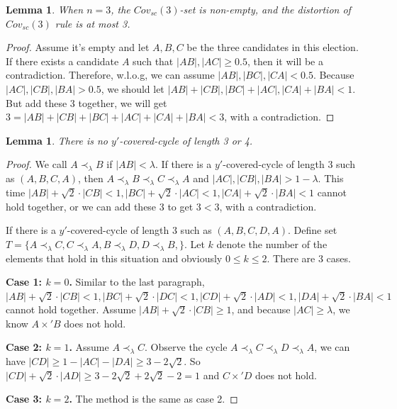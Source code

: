 \documentclass[11pt]{article}
\newtheorem{lemma}[theorem]{Lemma}
\theoremstyle{remark}
\begin{document}
\begin{lemma}
When $n=3$, the $Cov_{sc}(3)$-set is non-empty, and the distortion of $Cov_{sc}(3)$ rule is at most 3.
\end{lemma}

\begin{proof}
Assume it's empty and let $A,B,C$ be the three candidates in this election. If there exists a candidate $A$ such that $|AB|,|AC|\ge 0.5$, then it will be a contradiction. Therefore, w.l.o.g, we can assume $|AB|,|BC|,|CA|<0.5$. Because $|AC|,|CB|,|BA|>0.5$, we should let $|AB|+|CB|,|BC|+|AC|,|CA|+|BA|<1$. But add these 3 together, we will get $3=|AB|+|CB|+|BC|+|AC|+|CA|+|BA|<3$, with a contradiction.
\end{proof}

\begin{lemma}
There is no $y'$-covered-cycle of length 3 or 4.
\end{lemma}

\begin{proof}
We call $A\prec_{\lambda}B$ if $|AB|<\lambda$. If there is a $y'$-covered-cycle of length 3 such as $(A,B,C,A)$, then $A\prec_{\lambda}B\prec_{\lambda}C\prec_{\lambda}A$ and $|AC|,|CB|,|BA|>1-\lambda$. This time $|AB|+\sqrt2\cdot|CB|<1,|BC|+\sqrt2\cdot|AC|<1,|CA|+\sqrt2\cdot|BA|<1$ cannot hold together, or we can add these 3 to get $3<3$, with a contradiction.

If there is a $y'$-covered-cycle of length 3 such as $(A,B,C,D,A)$. Define set $T=\{A\prec_{\lambda}C,C\prec_{\lambda}A,B\prec_{\lambda}D,D\prec_{\lambda}B,\}$. Let $k$ denote the number of the elements that hold in this situation and obviously $0\le k\le 2$. There are 3 cases.

\noindent\textbf{Case 1: $k=0$.} Similar to the last paragraph, $|AB|+\sqrt2\cdot|CB|<1,|BC|+\sqrt2\cdot|DC|<1,|CD|+\sqrt2\cdot|AD|<1,|DA|+\sqrt2\cdot|BA|<1$ cannot hold together. Assume $|AB|+\sqrt2\cdot|CB|\ge 1$, and because $|AC|\ge \lambda$, we know $A\times' B$ does not hold.

\noindent\textbf{Case 2: $k=1$.} Assume $A\prec_{\lambda}C$. Observe the cycle $A\prec_{\lambda}C\prec_{\lambda}D\prec_{\lambda}A$, we can have $|CD|\ge 1-|AC|-|DA|\ge 3-2\sqrt2$. So $|CD|+\sqrt2\cdot |AD|\ge 3-2\sqrt2+2\sqrt2-2=1$ and $C\times' D$ does not hold.

\noindent\textbf{Case 3: $k=2$.} The method is the same as case 2.

\end{proof}
\end{document}
